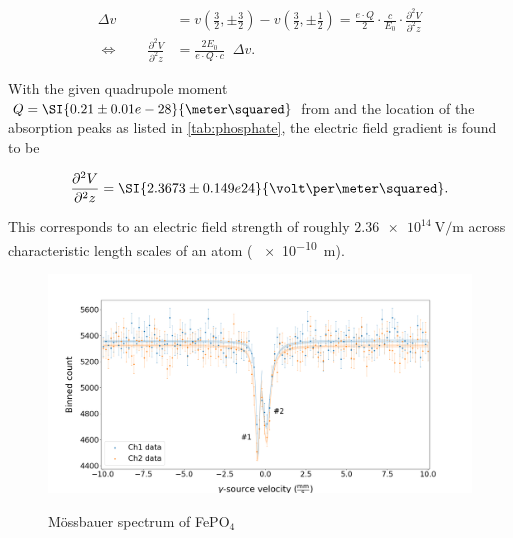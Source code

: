 \begin{align*}
\Delta v &= v(\frac{3}{2},\pm\frac{3}{2}) - v(\frac{3}{2},\pm\frac{1}{2}) = \frac{e\cdot Q}{2}\cdot\frac{c}{E_0}\cdot\frac{\partial^2 V}{\partial^2 z} \\
\Leftrightarrow\qquad\frac{\partial^2 V}{\partial^2 z} &= \frac{2E_0}{e\cdot Q\cdot c}\;\;\Delta v.
\end{align*}

With the given quadrupole moment $Q=\SI{0.21\pm0.01e-28}{\meter\squared}$ from 
\cite{Sch17}and the location of the absorption peaks as listed in 
\autoref{tab:phosphate}, the electric field gradient is found to be

\begin{equation}
\label{eq:field-gradient}
\frac{\partial^2 V}{\partial^2 z} = \SI{2.3673\pm0.149e24}{\volt\per\meter\squared}.
\end{equation}

This corresponds to an electric field strength of roughly 
$\SI{2.36e14}{\volt\per\meter}$ across characteristic length scales of an atom (
\SI{e-10}{\meter}).

\begin{figure}
	\includegraphics[width=1.0\textwidth]{./fig/Phosphate.png}
	\caption{Mössbauer spectrum of FePO$_4$}{}
	\label{fig:phosphate}
\end{figure}


